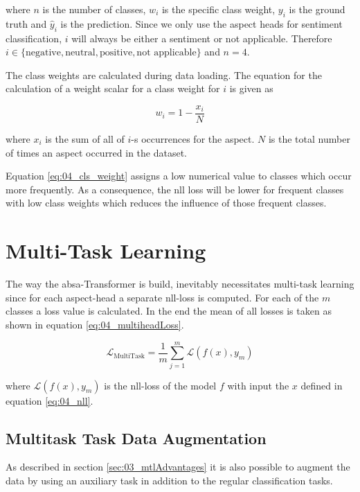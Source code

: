 where $n$ is the number of classes, $w_i$ is the specific class weight, $y_i$ is the ground truth and $\hat{y}_i$ is the prediction. Since we only use the aspect heads for sentiment classification, $i$ will always be either a sentiment or not applicable. Therefore $i \in \{\text{negative}, \text{neutral}, \text{positive}, \text{not applicable\}}$ and $n=4$.
\medskip

The class weights are calculated during data loading. The equation for the calculation of a weight scalar for a class weight for $i$ is given as

\begin{equation}
	w_i = 1 - \frac{x_i}{N}
\label{eq:04_cls_weight}
\end{equation}

where $x_i$ is the sum of all of $i$-s occurrences for the aspect. $N$ is the total number of times an aspect occurred in the dataset.
\medskip

Equation \ref{eq:04_cls_weight} assigns a low numerical value to classes which occur more frequently. As a consequence, the nll loss will be lower for frequent classes with low class weights which reduces the influence of those frequent classes.  

\section{Multi-Task Learning}
\label{sec:04_multitask}
The way the \gls{absa}-Transformer is build, inevitably necessitates multi-task learning since for each aspect-head a separate \gls{nll}-loss is computed. For each of the $m$ classes a loss value is calculated. In the end the mean of all losses is taken as shown in equation \ref{eq:04_multiheadLoss}.

\begin{equation}
\mathcal{L}_\text{MultiTask} = \frac{1}{m}\sum_{j=1}^{m}\mathcal{L}(f(x), y_m)
\label{eq:04_multiheadLoss}
\end{equation}

where $\mathcal{L}(f(x), y_m)$ is the \gls{nll}-loss of the model $f$ with input the $x$ defined in equation \ref{eq:04_nll}.

\subsection*{Multitask Task Data Augmentation}

As described in section \ref{sec:03_mtlAdvantages} it is also possible to augment the data by using an auxiliary task in addition to the regular classification tasks.

